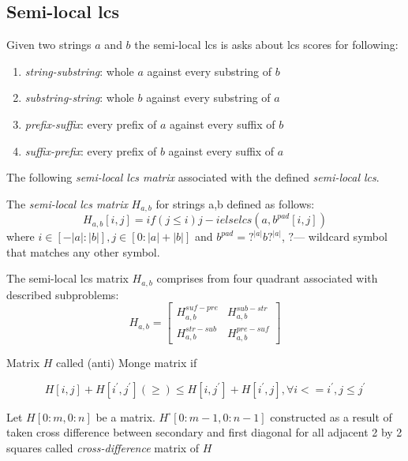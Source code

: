 \subsection{Semi-local lcs}

Given two strings $a$ and $b$ the semi-local lcs is asks about
lcs scores for following:
\begin{enumerate}
\item \emph{string-substring}: whole $a$ against every substring of $b$
\item \emph{substring-string}: whole $b$ against every substring of $a$
\item \emph{prefix-suffix}: every prefix of $a$ against every suffix of $b$
\item \emph{suffix-prefix}: every prefix of $b$ against every suffix of $a$
\end{enumerate} 


The following \emph{semi-local lcs matrix} associated with the defined \emph{semi-local lcs}.
\begin{definition}
The \emph{semi-local lcs matrix}  $H_{a,b}$ for strings a,b defined as follows:
\begin{equation}
	H_{a,b}[i,j] = if (j\leq i) j-i  else lcs(a,b^{pad}[i,j]) 
\end{equation} 
where $i \in [-|a|:|b|], j \in [0:|a|+|b|] $ and $b^{pad}= ?^{|a|}b?^{|a|}$, $?$--- wildcard symbol that matches any other symbol.
\end{definition}
The semi-local lcs matrix $H_{a,b}$ comprises from four
quadrant associated with described  subproblems:
\begin{equation}
 H_{a,b} = \begin{bmatrix}
H_{a,b}^{suf-pre} & H_{a,b}^{sub-str} \\
H_{a,b}^{str-sub} & H_{a,b}^{pre-suf} 
\end{bmatrix}    
\end{equation}

\begin{definition}
Matrix $H$ called (anti) Monge matrix if

\begin{displaymath}
H[i,j]+H[i^{'},j^{'}] (\geq)\leq H[i,j^{'}]+H[i^{'},j], \forall i<=i^{'}, j \leq j^{'}
\end{displaymath}
\end{definition}

\begin{definition}
Let $H[0:m,0:n]$  be a matrix.
$H^{\square}[0:m-1,0:n-1]$ constructed as a result of taken cross difference between secondary and first diagonal for all adjacent 2 by 2 squares called \emph{cross-difference} matrix of  $H$
\end{definition}


